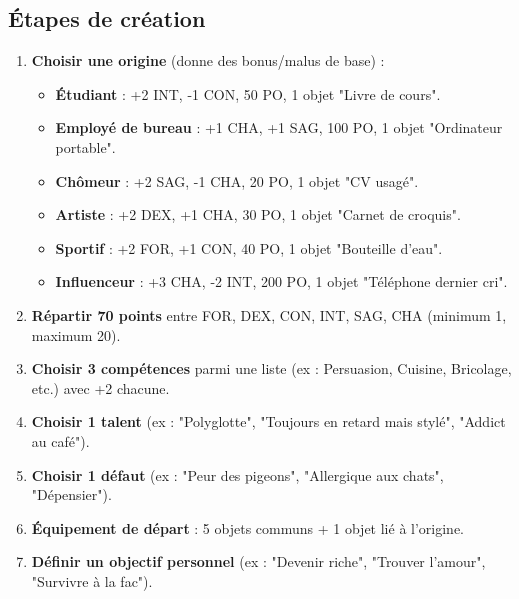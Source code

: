 \documentclass[11pt, a4paper]{article}
\begin{document}
\subsection{Étapes de création}
\begin{enumerate}
    \item \textbf{Choisir une origine} (donne des bonus/malus de base) :
    \begin{itemize}
        \item \textbf{Étudiant} : +2 INT, -1 CON, 50 PO, 1 objet "Livre de cours".
        \item \textbf{Employé de bureau} : +1 CHA, +1 SAG, 100 PO, 1 objet "Ordinateur portable".
        \item \textbf{Chômeur} : +2 SAG, -1 CHA, 20 PO, 1 objet "CV usagé".
        \item \textbf{Artiste} : +2 DEX, +1 CHA, 30 PO, 1 objet "Carnet de croquis".
        \item \textbf{Sportif} : +2 FOR, +1 CON, 40 PO, 1 objet "Bouteille d'eau".
        \item \textbf{Influenceur} : +3 CHA, -2 INT, 200 PO, 1 objet "Téléphone dernier cri".
    \end{itemize}

\item \textbf{Répartir 70 points} entre FOR, DEX, CON, INT, SAG, CHA (minimum 1, maximum 20).

\item \textbf{Choisir 3 compétences} parmi une liste (ex : Persuasion, Cuisine, Bricolage, etc.) avec +2 chacune.

\item \textbf{Choisir 1 talent} (ex : "Polyglotte", "Toujours en retard mais stylé", "Addict au café").

\item \textbf{Choisir 1 défaut} (ex : "Peur des pigeons", "Allergique aux chats", "Dépensier").

\item \textbf{Équipement de départ} : 5 objets communs + 1 objet lié à l'origine.

\item \textbf{Définir un objectif personnel} (ex : "Devenir riche", "Trouver l'amour", "Survivre à la fac").

\end{enumerate}

\end{document}
